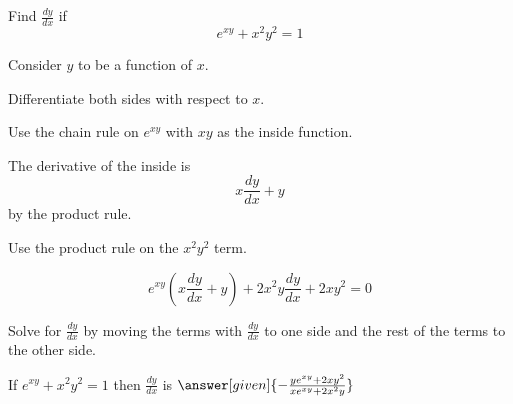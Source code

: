 \documentclass{ximera}
\begin{document}
\begin{question} %
  Find $\frac{dy}{dx}$ if
  \[
  e^{xy} + x^2y^2 = 1
  \]
  
	  
    \begin{hint}
      Consider $y$ to be a function of $x$.
    \end{hint}
		\begin{hint}
		  Differentiate both sides with respect to $x$.
		\end{hint}
    \begin{hint}
      Use the chain rule on $e^{xy}$ with $xy$ as the inside function.
    \end{hint}
    \begin{hint}
      The derivative of the inside is 
      \[
      x\frac{dy}{dx} + y
      \]
			by the product rule.
    \end{hint}
		\begin{hint}
      Use the product rule on the $x^2y^2$ term.
    \end{hint}
		\begin{hint}
		  \[
			e^{xy} \left( x\frac{dy}{dx} + y\right) + 2x^2y \frac{dy}{dx} + 2xy^2 = 0
			\]
		\end{hint}
		\begin{hint}
		  Solve for $\frac{dy}{dx}$ by moving the terms with $\frac{dy}{dx}$ to one side and the 
			rest of the terms to the other side.
		\end{hint}
    
		If $e^{xy} + x^2y^2 = 1$ then $\frac{dy}{dx}$ is
		 $\answer[given]{-\frac{ye^{xy} +2xy^2}{xe^{xy} + 2x^2y}}$
		
\end{question}




\begin{center}
\begin{foldable}
\end{foldable}
\end{center}
\end{document}
